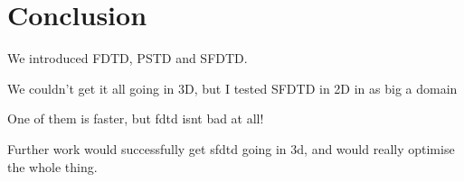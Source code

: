 %
%
%
\chapter{Conclusion}
We introduced FDTD, PSTD and SFDTD.

We couldn't get it all going in 3D, but I tested SFDTD in 2D in as big a domain

One of them is faster, but fdtd isnt bad at all!

Further work would successfully get sfdtd going in 3d, and would really optimise the whole thing.


